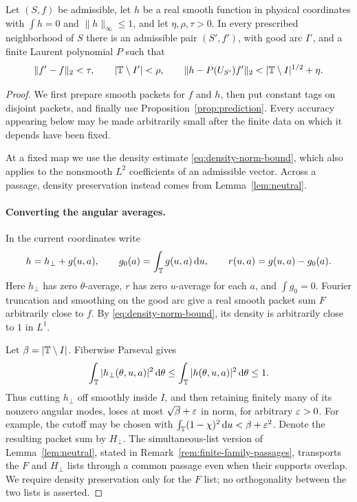 \begin{proposition}\label{prop:stage}
Let $(S,f)$ be admissible, let $h$ be a real smooth function in physical
coordinates with $\int h=0$ and $\|h\|_\infty\le1$, and let
$\eta,\rho,\tau>0$.  In every prescribed neighborhood of $S$ there is an
admissible pair $(S',f')$, with good arc $I'$, and a finite Laurent
polynomial $P$ such that
\begin{equation}\label{eq:stage-conclusion}
 \|f'-f\|_2<\tau,\qquad
 |\T\setminus I'|<\rho,\qquad
 \|h-P(U_{S'})f'\|_2
 <|\T\setminus I|^{1/2}+\eta.
\end{equation}
\end{proposition}

\begin{proof}
We first prepare smooth packets for $f$ and $h$, then put constant tags
on disjoint packets, and finally use Proposition~\ref{prop:prediction}.
Every accuracy appearing below may be made arbitrarily small after the
finite data on which it depends have been fixed.

At a fixed map we use the density estimate
\eqref{eq:density-norm-bound}, which also applies to the nonsmooth
$L^2$ coefficients of an admissible vector. Across a passage, density
preservation instead comes from Lemma~\ref{lem:neutral}.

\paragraph{Converting the angular averages.}
In the current coordinates write
\[
 h=h_\perp+g(u,a),\qquad
 g_0(a)=\int_\mathbb T g(u,a)\,\mathrm d u,\qquad r(u,a)=g(u,a)-g_0(a).
\]
Here $h_\perp$ has zero $\theta$-average, $r$ has zero $u$-average
for each $a$, and $\int g_0=0$.  Fourier truncation and smoothing on the
good arc give a real smooth packet sum $F$ arbitrarily close to $f$.
By \eqref{eq:density-norm-bound}, its density is arbitrarily close to $1$
in $L^1$.

Let $\beta=|\mathbb T\setminus I|$.  Fiberwise Parseval gives
\[
 \int_\mathbb T|h_\perp(\theta,u,a)|^2\,\mathrm d\theta
 \le \int_\mathbb T|h(\theta,u,a)|^2\,\mathrm d\theta\le1.
\]
Thus cutting $h_\perp$ off smoothly inside $I$, and then retaining
finitely many of its nonzero angular modes, loses at most
$\sqrt\beta+\varepsilon$ in norm, for arbitrary $\varepsilon>0$.  For example, the
cutoff may be chosen with
$\int_\mathbb T(1-\chi)^2\,\mathrm d u<\beta+\varepsilon^2$.
Denote the resulting packet sum by $H_\perp$.
The simultaneous-list version of Lemma~\ref{lem:neutral}, stated in
Remark~\ref{rem:finite-family-passages}, transports the $F$ and
$H_\perp$ lists through a common passage even when their supports
overlap.  We require density preservation only for the $F$ list; no
orthogonality between the two lists is asserted.


\end{proof}
